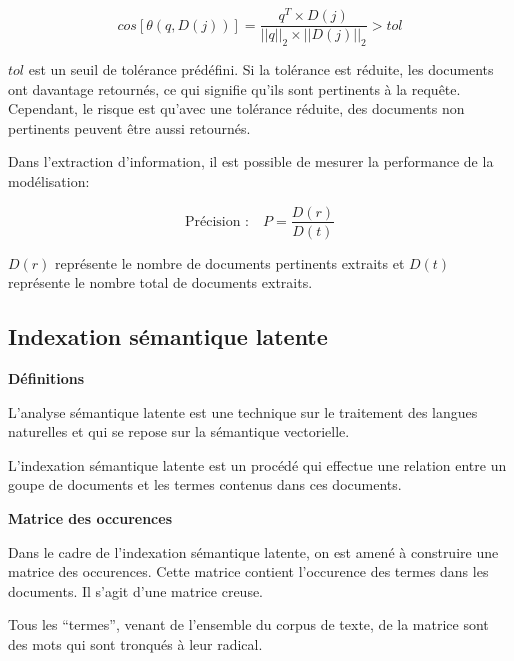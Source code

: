 \[
	cos \left[ \theta(q, D(j)) \right]
	= \frac{q^T \times D(j)}
	       {\left|\left| q    \right|\right| _2 \times
	        \left|\left| D(j) \right|\right| _2} > tol
\]

$tol$ est un seuil de tolérance prédéfini.
Si la tolérance est réduite,
les documents ont davantage retournés,
ce qui signifie qu'ils sont pertinents à la requête.
Cependant, le risque est qu'avec une tolérance réduite,
des documents non pertinents peuvent être aussi retournés.

Dans l'extraction d'information,
il est possible de mesurer la performance de la modélisation:

\[
	\mbox{Précision :} \quad P = \frac{D(r)}{D(t)}
\]

$D(r)$ représente le nombre de documents pertinents extraits
et $D(t)$ représente le nombre total de documents extraits.

\subsection{Indexation sémantique latente}

{\bf Définitions}

L'analyse sémantique latente est une technique sur le traitement
des langues naturelles et qui se repose sur la sémantique vectorielle.

L'indexation sémantique latente est un procédé qui effectue une relation
entre un goupe de documents et les termes contenus dans ces documents.

{\bf Matrice des occurences}

Dans le cadre de l'indexation sémantique latente,
on est amené à construire une matrice des occurences.
Cette matrice contient l'occurence des termes dans les documents.
Il s'agit d'une matrice creuse.

Tous les ``termes'', venant de l'ensemble du corpus de texte,
de la matrice sont des mots qui sont tronqués à leur radical.
